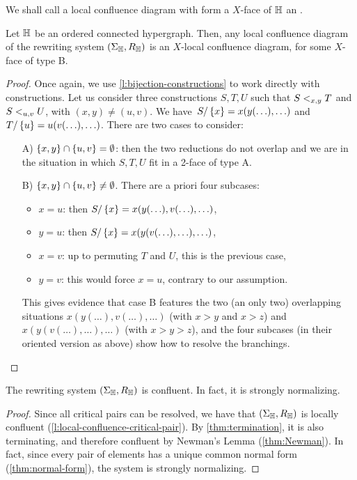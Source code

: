 We shall call a local confluence diagram with form a $X$-face of ${\mathbb H}$ an .

\begin{thm}
  \label{thm:critical-pairs}
  Let ${\mathbb H}$ be an ordered connected hypergraph. 
  Then, any local confluence diagram of the rewriting system $(\Sigma_{\mathbb H},R_{\mathbb H})$ is an $X$-local confluence diagram, for some $X$-face of type B.
\end{thm}

\begin{proof}
  Once again, we use \cref{l:bijection-constructions} to work directly with constructions. 
Let us consider three constructions $S,T,U$ such that $S<_{x,y}T$ and $S <_{u,v} U$, with $(x,y)\neq(u,v)$.
  We have~$S/\left\{x\right\}=x(y(\ldots),\ldots)$ and $T/\left\{u\right\}=u(v(\ldots),\ldots)$. 
  There are two cases to consider:
  \begin{itemize}
  \item[A)] $\left\{x,y\right\}\cap\left\{u,v\right\}=\emptyset$: then the two reductions do not overlap and we are in the situation in which $S,T,U$ fit in a 2-face of type A.
  \item[B)] $\left\{x,y\right\}\cap\left\{u,v\right\}\neq\emptyset$. 
  There are a priori four subcases:
  \begin{itemize}
  \item $x=u$: then $S/\left\{x\right\}=x(y(\ldots),v(\ldots),\ldots)$,
  \item $y=u$: then  $S/\left\{x\right\}=x(y(v(\ldots),\ldots),\ldots)$,
  \item $x=v$: up to permuting $T$ and $U$, this is the previous case,
  \item $y=v$: this would force $x=u$, contrary to our assumption.
  \end{itemize}
  This gives evidence that case B features the two (an only two) overlapping situations $x(y(\ldots),v(\ldots),\ldots)$ (with $x>y$ and $x>z$) and 
  $x(y(v(\ldots),\ldots),\ldots)$ (with $x>y>z$), and the four subcases  (in their oriented version as above) show how to resolve the branchings.
\end{itemize}
\end{proof}


\begin{thm}
  \label{thm:confluent}
  The rewriting system $(\Sigma_{\mathbb H},R_{\mathbb H})$ is confluent.
  In fact, it is strongly normalizing.
\end{thm}

\begin{proof}
  Since all critical pairs can be resolved, we have that $(\Sigma_{\mathbb H},R_{\mathbb H})$ is locally confluent (\cref{l:local-confluence-critical-pair}). 
  By \cref{thm:termination}, it is also terminating, and therefore confluent by Newman's Lemma (\cref{thm:Newman}).
  In fact, since every pair of elements has a unique common normal form (\cref{thm:normal-form}), the system is strongly normalizing. 
\end{proof}




